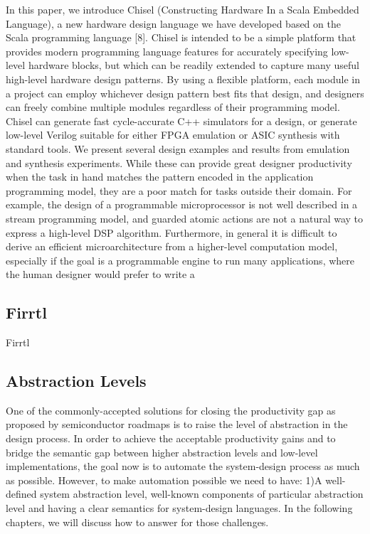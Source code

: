 In this paper, we introduce Chisel (Constructing Hardware In a Scala Embedded Language), a new hardware design language we have developed based on the Scala programming language [8]. Chisel is intended to be a simple
platform that provides modern programming language features for accurately specifying low-level hardware blocks,
but which can be readily extended to capture many useful high-level hardware design patterns. By using a flexible
platform, each module in a project can employ whichever
design pattern best fits that design, and designers can freely
combine multiple modules regardless of their programming
model. Chisel can generate fast cycle-accurate C++ simulators for a design, or generate low-level Verilog suitable for
either FPGA emulation or ASIC synthesis with standard
tools. We present several design examples and results from
emulation and synthesis experiments.
While these can provide great designer productivity when
the task in hand matches the pattern encoded in the application programming model, they are a poor match for tasks
outside their domain. For example, the design of a programmable microprocessor is not well described in a stream
programming model, and guarded atomic actions are not a
natural way to express a high-level DSP algorithm. Furthermore, in general it is difficult to derive an efficient microarchitecture from a higher-level computation model, especially
if the goal is a programmable engine to run many applications, where the human designer would prefer to write a

\subsection{Firrtl}
Firrtl~\cite{izraelevitz_2017_firrtl_reusability, li_2016_firrtl_specification}




\subsection{Abstraction Levels}

One of the commonly-accepted solutions for closing the productivity gap as
proposed by semiconductor roadmaps is to raise the level of abstraction in the design process. In order to achieve the acceptable productivity gains
and to bridge the semantic gap between higher abstraction levels and low-level
implementations, the goal now is to automate the system-design process as
much as possible. 
However, to make automation possible we need to have: 1)A well-defined system abstraction level, well-known components of particular abstraction level and having a clear semantics for system-design languages.
In the following chapters, we will discuss how to answer for those challenges.

